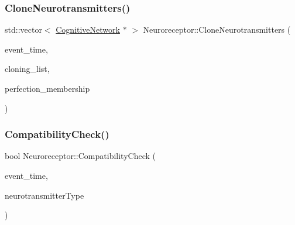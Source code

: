 \mbox{\label{classNeuroreceptor_af953abb478f4a3a1843b4b61f9969274}} 
\subsubsection{\texorpdfstring{Clone\+Neurotransmitters()}{CloneNeurotransmitters()}}
{\footnotesize\ttfamily std\+::vector$<$ \mbox{\hyperlink{classCognitiveNetwork}{Cognitive\+Network}} $\ast$ $>$ Neuroreceptor\+::\+Clone\+Neurotransmitters (\begin{DoxyParamCaption}\item[{std\+::chrono\+::time\+\_\+point$<$ \mbox{\hyperlink{universe_8h_a0ef8d951d1ca5ab3cfaf7ab4c7a6fd80}{Clock}} $>$}]{event\+\_\+time,  }\item[{std\+::vector$<$ \mbox{\hyperlink{classCognitiveNetwork}{Cognitive\+Network}} $\ast$$>$}]{cloning\+\_\+list,  }\item[{double}]{perfection\+\_\+membership }\end{DoxyParamCaption})}

\mbox{\label{classNeuroreceptor_a5d54ca353f0be78522aacc4fca06db63}} 
\subsubsection{\texorpdfstring{Compatibility\+Check()}{CompatibilityCheck()}}
{\footnotesize\ttfamily bool Neuroreceptor\+::\+Compatibility\+Check (\begin{DoxyParamCaption}\item[{std\+::chrono\+::time\+\_\+point$<$ \mbox{\hyperlink{universe_8h_a0ef8d951d1ca5ab3cfaf7ab4c7a6fd80}{Clock}} $>$}]{event\+\_\+time,  }\item[{int}]{neurotransmitter\+Type }\end{DoxyParamCaption})}

\mbox{\label{classNeuroreceptor_af671059884336eadbc367f9d8556eb3f}} 
